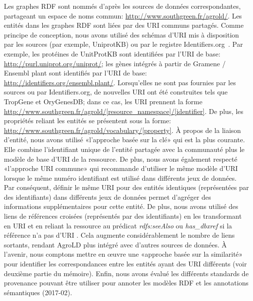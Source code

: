 Les graphes RDF sont nommés d'après les sources de données correspondantes, partageant un espace de noms commun: \url{http://www.southgreen.fr/agrold/}. Les entités dans les graphes RDF sont liées par des URI communs partagés. Comme principe de conception, nous avons utilisé des schémas d'URI mis à disposition par les sources (par exemple, UniprotKB) ou par le registre Identifiers.org~\cite{identifiers}. Par exemple, les protéines de UnitProtKB sont identifiées par l'URI de base: \url{http://purl.uniprot.org/uniprot/}; les gènes intégrés à partir de Gramene / Ensembl plant sont identifiés par l'URI de base: \url{http://identifiers.org/ensembl.plant/}. Lorsqu'elles ne sont pas fournies par les sources ou par Identifiers.org, de nouvelles URI ont été construites tels que TropGene et OryGenesDB; dans ce cas, les URI prennent la forme \url{http://www.southgreen.fr/agrold/[resource\_namespace]/[identifier]}. De plus, les propriétés reliant les entités se présentent sous la forme: \url{http://www.southgreen.fr/agrold/vocabulary/[property]}. À propos de la liaison d'entité, nous avons utilisé «l'approche basée sur la clé» qui est la plus courante. Elle combine l'identifiant unique de l'entité partagée avec la communauté plus le modèle de base d'URI de la ressource. De plus, nous avons également respecté «l’approche URI commune» qui recommande d’utiliser le même modèle d’URI lorsque le même numéro identifiant est utilisé dans différents jeux de données. Par conséquent, définir le même URI pour des entités identiques (représentées par des identifiants) dans différents jeux de données permet d'agréger des informations supplémentaires pour cette entité. De plus, nous avons utilisé des liens de références croisées (représentés par des identifiants) en les transformant en URI et en reliant la ressource au prédicat \textit{rdfs:seeAlso} ou \textit{has\_dbxref} si la référence n'a pas d'URI . Cela augmente considérablement le nombre de liens sortants, rendant AgroLD plus intégré avec d'autres sources de données. À l'avenir, nous comptons mettre en œuvre une «approche basée sur la similarité» pour identifier les correspondances entre les entités ayant des URI différents (voir deuxième partie du mémoire). Enfin, nous avons évalué les différents standards de provenance pouvant être utiliser pour annoter les modèles RDF et les annotations sémantiques (2017-02).\\

